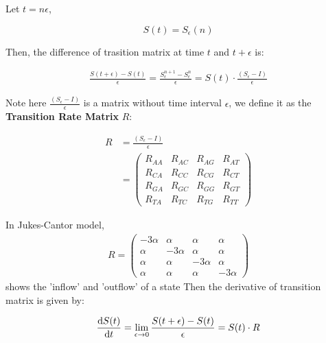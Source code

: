 \documentclass[12pt]{book}
\begin{document}
        Let $t = n \epsilon$,

        \begin{equation*}
            S(t)=S_{\epsilon}(n)
        \end{equation*}

        Then, the difference of trasition matrix at time $t$ and $t+\epsilon$ is:

        \begin{align*}
            \frac{S(t+\epsilon)-S(t)}{\epsilon} = \frac{S_{\epsilon}^{n+1}-S_{\epsilon}^n}{\epsilon} = S(t) \cdot \frac{(S_{\epsilon}-I)}{\epsilon}
        \end{align*}
        
        Note here $\frac{(S_{\epsilon}-I)}{\epsilon}$ is a matrix without time interval $\epsilon$, we define it as the \textbf{Transition Rate Matrix} $R$:

        \begin{align*}
            R &= \frac{(S_{\epsilon}-I)}{\epsilon}\\
            &= \left(
                \begin{matrix}
                    R_{AA} & R_{AC} & R_{AG} & R_{AT}\\
                    R_{CA} & R_{CC} & R_{CG} & R_{CT}\\
                    R_{GA} & R_{GC} & R_{GG} & R_{GT}\\
                    R_{TA} & R_{TC} & R_{TG} & R_{TT}
                \end{matrix}
            \right)
        \end{align*}

        In Jukes-Cantor model,
        {\tiny
        \begin{align*}
            R = \left(
                \begin{matrix}
                    - 3\alpha & \alpha & \alpha & \alpha \\
                    \alpha & - 3\alpha & \alpha & \alpha\\
                    \alpha & \alpha & - 3\alpha & \alpha\\
                    \alpha & \alpha & \alpha & - 3\alpha
                \end{matrix}
            \right)
        \end{align*}
        }
        shows the 'inflow' and 'outflow' of a state
        Then the derivative of transition matrix is given by:

        \begin{equation*}
            \frac{\textup{d} S(t)}{\textup{d} t} = \lim_{\epsilon \rightarrow 0}\frac{S(t+\epsilon)-S(t)}{\epsilon} = S(t) \cdot R
        \end{equation*}
\end{document}
